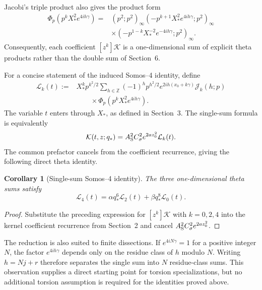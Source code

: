 \documentclass[11pt]{article}
\newtheorem{corollary}[proposition]{Corollary}
\numberwithin{equation}{section}
\begin{document}
Jacobi's triple product also gives the product form
\begin{equation}
\boxed{
\begin{aligned}
\Phi_p\!\left(p^kX_\ast^2e^{4ih\gamma}\right)
={}&(p^2;p^2)_\infty
\left(-p^{k+1}X_\ast^2e^{4ih\gamma};p^2\right)_\infty\\
&\times
\left(-p^{1-k}X_\ast^{-2}e^{-4ih\gamma};p^2\right)_\infty.
\end{aligned}}
\end{equation}
Consequently, each coefficient $[z^k]\mathcal K$ is a one-dimensional sum of
explicit theta products rather than the double sum of Section~6.

For a concise statement of the induced Somos--4 identity, define
\begin{equation}
\boxed{
\begin{aligned}
\mathcal L_k(t):={}&X_\ast^kp^{k^2/2}
\sum_{h\in\mathbb Z}(-1)^hp^{h^2/2}e^{2ih(x_0+k\gamma)}
\mathcal J_k(h;p)\\
&\qquad\times
\Phi_p\!\left(p^kX_\ast^2e^{4ih\gamma}\right).
\end{aligned}}
\end{equation}
The variable $t$ enters through $X_\ast$, as defined in Section~3.  The
single-sum formula is equivalently
\begin{equation}
[z^k]\mathcal K(t,z;q_\ast)
=A_{\rm S}^2C_\sigma^2e^{2az_0^2}\mathcal L_k(t).
\end{equation}
The common prefactor cancels from the coefficient recurrence, giving the
following direct theta identity.

\begin{corollary}[Single-sum Somos--4 identity]
The three one-dimensional theta sums satisfy
\begin{equation}
\boxed{
\mathcal L_4(t)
=\alpha q_\ast^6\mathcal L_2(t)
+\beta q_\ast^8\mathcal L_0(t).
}
\end{equation}
\end{corollary}
\begin{proof}
Substitute the preceding expression for $[z^k]\mathcal K$ with
$k=0,2,4$ into the kernel coefficient recurrence from Section~2 and cancel
$A_{\rm S}^2C_\sigma^2e^{2az_0^2}$.
\end{proof}

The reduction is also suited to finite dissections.  If
$e^{4iN\gamma}=1$ for a positive integer $N$, the factor
$e^{4ih\gamma}$ depends only on the residue class of $h$ modulo $N$.
Writing $h=Nj+r$ therefore separates the single sum into $N$ residue-class
sums.  This observation supplies a direct starting point for torsion
specializations, but no additional torsion assumption is required for the
identities proved above.
\end{document}
